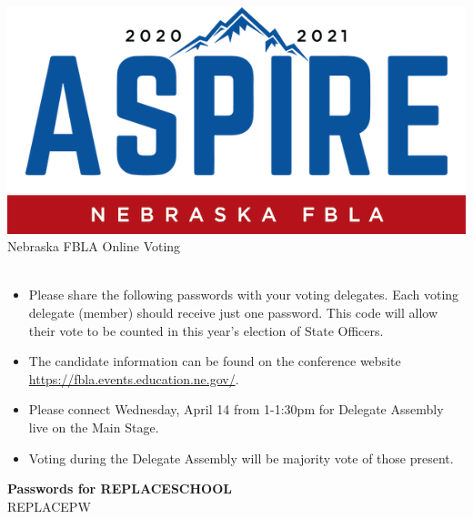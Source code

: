 \documentclass{article}
\begin{document}
\includegraphics{pdfs/template/logo.png}
{\Huge Nebraska FBLA Online Voting} \\ \\


{
    \begin{itemize}
    \large
    \item Please share the following passwords with your voting
    delegates. Each voting delegate (member) should receive just one
    password. This code will allow their vote to be counted in this
    year’s election of State Officers.

    \item The candidate information can be found on the conference
    website \url{https://fbla.events.education.ne.gov/}.

    \item Please connect Wednesday, April 14 from 1-1:30pm for Delegate
    Assembly live on the Main Stage.

    \item Voting during the Delegate Assembly will be majority vote of
    those present.
    \end{itemize}
}

\large
\centering
\textbf{Passwords for REPLACESCHOOL} \\
REPLACEPW
\centering
\end{document}
